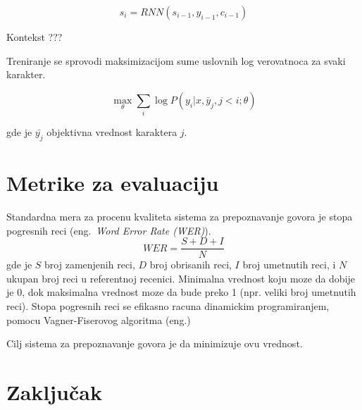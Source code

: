 \documentclass[a4paper]{article}
\begin{document}
 \begin{equation}
\label{eq:state}
s_i = RNN (s_{i-1},  y_{i-1},  c_{i-1})
\end{equation}

\bigskip

Kontekst ???

Treniranje se sprovodi maksimizacijom sume uslovnih log verovatnoca za svaki karakter.

 \begin{equation}
\label{eq:max}
\max_{\theta} \sum_i \log P(y_i | x,  \bar{y}_j,  j < i; \theta)
\end{equation}

gde je $\bar{y_j}$ objektivna vrednost karaktera $j$.

\section{Metrike za evaluaciju}
Standardna mera za procenu kvaliteta sistema za prepoznavanje govora je stopa pogresnih reci (eng.~{\em Word Error Rate (WER)}).
\begin{equation*}
  WER = \frac{S + D + I}{N}
\end{equation*}
gde je $S$ broj zamenjenih reci, $D$ broj obrisanih reci, $I$ broj umetnutih reci, i $N$ ukupan broj reci u referentnoj recenici.
Minimalna vrednost koju moze da dobije je 0, dok maksimalna vrednost moze da bude preko 1 (npr. veliki broj umetnutih reci).
Stopa pogresnih reci se efikasno racuna dinamickim programiranjem, pomocu Vagner-Fiserovog algoritma (eng.)

Cilj sistema za prepoznavanje govora je da minimizuje ovu vrednost.

\section{Zaključak}
\label{sec:zakljucak}

\end{document}
